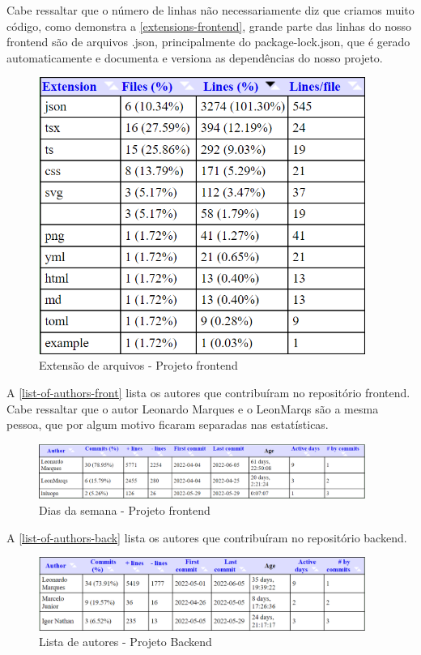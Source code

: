 Cabe ressaltar que o número de linhas não necessariamente diz que criamos muito código, como demonstra a \autoref{extensions-frontend}, grande parte das linhas do nosso \gls{frontend} são de arquivos .json, principalmente do package-lock.json, que é gerado automaticamente e documenta e versiona as dependências do nosso projeto.
\begin{figure}[H]
	\centering
	\caption{\label{extensions-frontend}Extensão de arquivos - Projeto \gls{frontend}}
	\includegraphics[width=0.95\textwidth]{../imagens/stats/extensions-frontend.png}
\end{figure}

A \autoref{list-of-authors-front} lista os autores que contribuíram no repositório \gls{frontend}. Cabe ressaltar que o autor Leonardo Marques e o LeonMarqs são a mesma pessoa, que por algum motivo ficaram separadas nas estatísticas.
\begin{figure}[H]
	\centering
	\caption{\label{list-of-authors-front}Dias da semana - Projeto \gls{frontend}}
	\includegraphics[width=0.95\textwidth]{../imagens/stats/list-of-authors-frontend.png}
\end{figure}

A \autoref{list-of-authors-back} lista os autores que contribuíram no repositório backend.
\begin{figure}[H]
	\centering
	\caption{\label{list-of-authors-back}Lista de autores - Projeto Backend}
	\includegraphics[width=0.95\textwidth]{../imagens/stats/list-of-authors-backend.png}
\end{figure}

